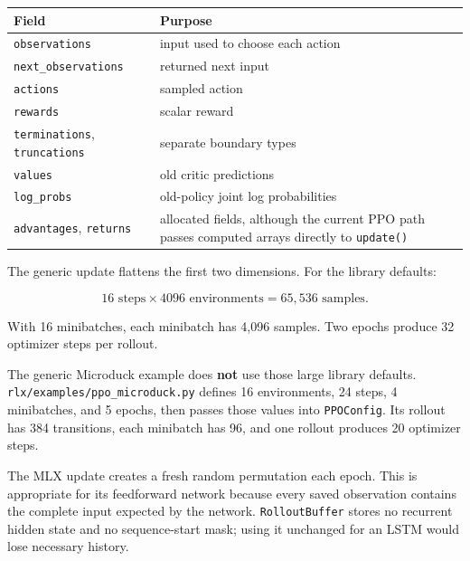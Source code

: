 \documentclass[
  american,
  11pt,
  letterpaper,
]{article}
\newcounter{none} %
\begin{document}
{\def\LTcaptype{none} %
\begin{longtable}[]{@{}
  >{\raggedright\arraybackslash}p{}
  >{\raggedright\arraybackslash}p{}@{}}
\toprule\noalign{}
\begin{minipage}[b]{\linewidth}\raggedright
Field
\end{minipage} & \begin{minipage}[b]{\linewidth}\raggedright
Purpose
\end{minipage} \\
\midrule\noalign{}
\endhead
\bottomrule\noalign{}
\endlastfoot
\texttt{observations} & input used to choose each action \\
\texttt{next\_\allowbreak{}observat\allowbreak{}ions} & returned next
input \\
\texttt{actions} & sampled action \\
\texttt{rewards} & scalar reward \\
\texttt{terminations}, \texttt{truncations} & separate boundary types \\
\texttt{values} & old critic predictions \\
\texttt{log\_probs} & old-policy joint log probabilities \\
\texttt{advantages}, \texttt{returns} & allocated fields, although the
current PPO path passes computed arrays directly to \texttt{update()} \\
\end{longtable}
}

The generic update flattens the first two dimensions. For the library
defaults:

\[
16\text{ steps}\times4096\text{ environments}
=65{,}536\text{ samples}.
\]

With 16 minibatches, each minibatch has 4,096 samples. Two epochs
produce 32 optimizer steps per rollout.

The generic Microduck example does \textbf{not} use those large library
defaults.
\texttt{rlx/\allowbreak{}examples\allowbreak{}/\allowbreak{}ppo\_\allowbreak{}microduc\allowbreak{}k.py}
defines 16 environments, 24 steps, 4 minibatches, and 5 epochs, then
passes those values into \texttt{PPOConfig}. Its rollout has 384
transitions, each minibatch has 96, and one rollout produces 20
optimizer steps.

The MLX update creates a fresh random permutation each epoch. This is
appropriate for its feedforward network because every saved observation
contains the complete input expected by the network.
\texttt{RolloutB\allowbreak{}uffer} stores no recurrent hidden state and
no sequence-start mask; using it unchanged for an LSTM would lose
necessary history.
\end{document}
